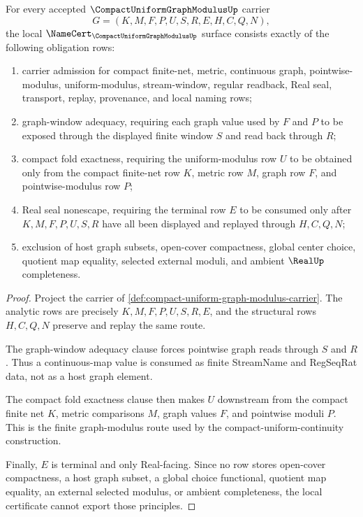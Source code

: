 \begin{theorem}
\label{thm:compact-uniform-graph-modulus-namecert-obligations}
For every accepted $\CompactUniformGraphModulusUp$ carrier
$$
G=(K,M,F,P,U,S,R,E,H,C,Q,N),
$$
the local $\NameCert_{\CompactUniformGraphModulusUp}$ surface consists exactly of the following obligation rows:
\begin{enumerate}
\item carrier admission for compact finite-net, metric, continuous graph, pointwise-modulus, uniform-modulus, stream-window, regular readback, Real seal, transport, replay, provenance, and local naming rows;
\item graph-window adequacy, requiring each graph value used by $F$ and $P$ to be exposed through the displayed finite window $S$ and read back through $R$;
\item compact fold exactness, requiring the uniform-modulus row $U$ to be obtained only from the compact finite-net row $K$, metric row $M$, graph row $F$, and pointwise-modulus row $P$;
\item Real seal nonescape, requiring the terminal row $E$ to be consumed only after $K,M,F,P,U,S,R$ have all been displayed and replayed through $H,C,Q,N$;
\item exclusion of host graph subsets, open-cover compactness, global center choice, quotient map equality, selected external moduli, and ambient $\RealUp$ completeness.
\end{enumerate}
\end{theorem}
\begin{proof}
Project the carrier of \autoref{def:compact-uniform-graph-modulus-carrier}. The analytic rows are precisely $K,M,F,P,U,S,R,E$, and the structural rows $H,C,Q,N$ preserve and replay the same route.

The graph-window adequacy clause forces pointwise graph reads through $S$ and $R$. Thus a continuous-map value is consumed as finite StreamName and RegSeqRat data, not as a host graph element.

The compact fold exactness clause then makes $U$ downstream from the compact finite net $K$, metric comparisons $M$, graph values $F$, and pointwise moduli $P$. This is the finite graph-modulus route used by the compact-uniform-continuity construction.

Finally, $E$ is terminal and only Real-facing. Since no row stores open-cover compactness, a host graph subset, a global choice functional, quotient map equality, an external selected modulus, or ambient completeness, the local certificate cannot export those principles.
\end{proof}

